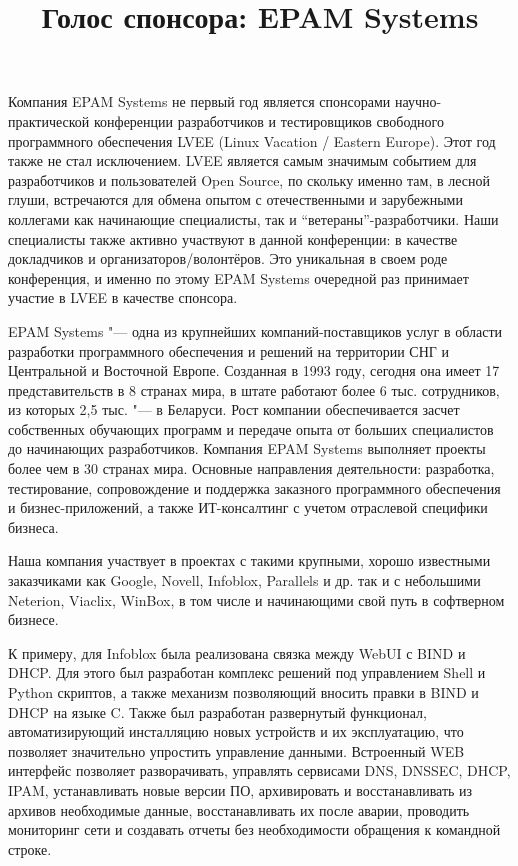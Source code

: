 \documentclass[10pt, a5paper]{article}
\begin{document}
\title{Голос спонсора: EPAM Systems}
\date{}
\maketitle

Компания EPAM Systems не первый год является спонсорами научно-практической конференции разработчиков и тестировщиков свободного программного обеспечения LVEE (Linux Vacation / Eastern Europe). Этот год также не стал исключением. LVEE является самым значимым событием для разработчиков и пользователей Open Source, по скольку именно там, в лесной глуши, встречаются для обмена опытом с отечественными и зарубежными коллегами как начинающие специалисты, так и “ветераны”-разработчики.  Наши специалисты также активно участвуют в данной конференции: в качестве докладчиков и организаторов/волонтёров. Это уникальная в своем роде конференция, и именно по этому EPAM Systems очередной раз принимает участие в LVEE в качестве спонсора. 

EPAM Systems "--- одна из крупнейших компаний-поставщиков услуг в области разработки программного обеспечения и решений на территории СНГ и  Центральной и Восточной Европе. Созданная в 1993 году, сегодня она имеет 17 представительств в 8 странах мира, в штате работают более 6 тыс. сотрудников, из которых 2,5 тыс. "--- в Беларуси. Рост компании обеспечивается засчет собственных обучающих программ и передаче опыта от больших специалистов до начинающих разработчиков. Компания EPAM Systems выполняет проекты более чем в 30 странах мира. Основные направления деятельности: разработка, тестирование, сопровождение и поддержка заказного программного обеспечения и бизнес-приложений, а также ИТ-консалтинг с учетом отраслевой специфики бизнеса.

Наша компания участвует в проектах с такими крупными, хорошо известными заказчиками как Google, Novell, Infoblox, Parallels и др. так и с небольшими Neterion, Viaclix, WinBox, в том числе и начинающими свой путь в софтверном бизнесе.

К примеру, для Infoblox была реализована связка между WebUI с BIND и DHCP. Для этого был разработан комплекс решений под управлением Shell и Python скриптов, а также механизм позволяющий вносить правки в BIND и DHCP на языке C. Также был разработан развернутый функционал, автоматизирующий инсталляцию новых устройств и их эксплуатацию, что позволяет значительно упростить управление данными.  Встроенный WEB интерфейс позволяет разворачивать, управлять сервисами DNS, DNSSEC, DHCP, IPAM, устанавливать новые версии ПО, архивировать и восстанавливать из архивов необходимые данные, восстанавливать их после аварии, проводить мониторинг сети и создавать отчеты без необходимости обращения к командной строке. 
\end{document}
